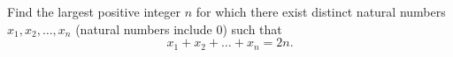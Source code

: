 Find the largest positive integer $n$ for which there exist distinct natural numbers $x_1,x_2,\dots,x_n$ (natural numbers include $0$) such that
\[
x_1+x_2+\dots+x_n=2n .
\]
